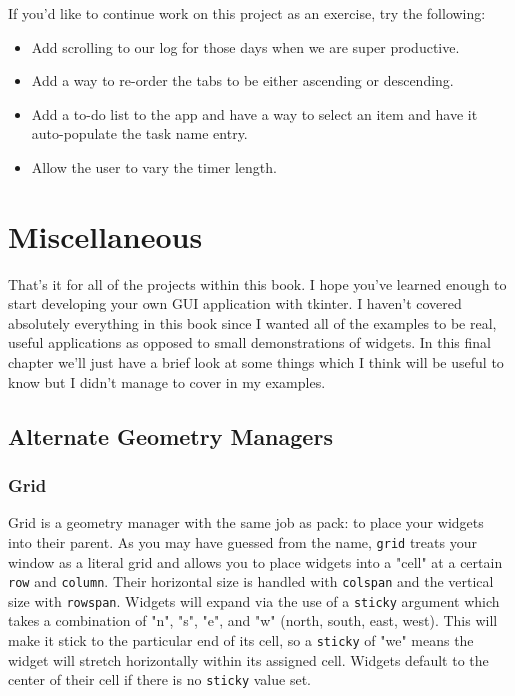 \documentclass[a4paper,11pt,openany]{book}
\begin{document}
If you'd like to continue work on this project as an exercise, try the following:

\begin{itemize}
  \item Add scrolling to our log for those days when we are super productive.
  \item Add a way to re-order the tabs to be either ascending or descending.
  \item Add a to-do list to the app and have a way to select an item and have it auto-populate the task name entry.
  \item Allow the user to vary the timer length. 
\end{itemize} 

\chapter{Miscellaneous}

That's it for all of the projects within this book. I hope you've learned enough to start developing your own GUI application with tkinter. I haven't covered absolutely everything in this book since I wanted all of the examples to be real, useful applications as opposed to small demonstrations of widgets. In this final chapter we'll just have a brief look at some things which I think will be useful to know but I didn't manage to cover in my examples. 

\section{Alternate Geometry Managers}

\subsection{Grid}

Grid is a geometry manager with the same job as pack: to place your widgets into their parent. As you may have guessed from the name, \lstinline[columns=fixed]{grid} treats your window as a literal grid and allows you to place widgets into a "cell" at a certain \lstinline[columns=fixed]{row} and \lstinline[columns=fixed]{column}. Their horizontal size is handled with \lstinline[columns=fixed]{colspan} and the vertical size with \lstinline[columns=fixed]{rowspan}. Widgets will expand via the use of a \lstinline[columns=fixed]{sticky} argument which takes a combination of "n", "s", "e", and "w" (north, south, east, west). This will make it stick to the particular end of its cell, so a \lstinline[columns=fixed]{sticky} of "we" means the widget will stretch horizontally within its assigned cell. Widgets default to the center of their cell if there is no \lstinline[columns=fixed]{sticky} value set. 
\end{document}

